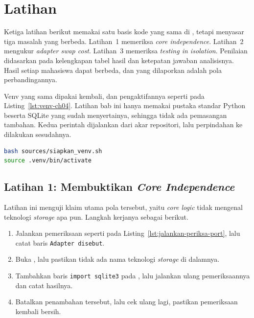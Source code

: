 \section{Latihan}

Ketiga latihan berikut memakai satu basis kode yang sama di
, tetapi menyasar tiga masalah yang berbeda.
Latihan~1 memeriksa \textit{core independence}. Latihan~2 mengukur
\textit{adapter swap cost}. Latihan~3 memeriksa \textit{testing in isolation}.
Penilaian didasarkan pada kelengkapan tabel hasil dan ketepatan jawaban
analisisnya. Hasil setiap mahasiswa dapat berbeda, dan yang dilaporkan adalah
pola perbandingannya.

Venv yang sama dipakai kembali, dan pengaktifannya seperti pada
Listing~\ref{lst:venv-ch04}. Latihan bab ini hanya memakai pustaka standar
Python beserta SQLite yang sudah menyertainya, sehingga tidak ada pemasangan
tambahan. Kedua perintah dijalankan dari akar repositori, lalu perpindahan ke
 dilakukan sesudahnya.

\begin{lstlisting}[language=bash, caption={Mengaktifkan venv sebelum ketiga
  latihan, skrip tersedia di \berkas{sources/siapkan_venv.sh}},
  label=lst:venv-ch04]
bash sources/siapkan_venv.sh
source .venv/bin/activate
\end{lstlisting}

\subsection*{Latihan 1: Membuktikan \textit{Core Independence}}

Latihan ini menguji klaim utama pola tersebut, yaitu \textit{core logic} tidak
mengenal teknologi \textit{storage} apa pun. Langkah kerjanya sebagai berikut.

\begin{enumerate}
  \item Jalankan pemeriksaan seperti pada
    Listing~\ref{lst:jalankan-periksa-port}, lalu catat baris \texttt{Adapter
    disebut}.
  \item Buka , lalu pastikan tidak ada nama
    teknologi \textit{storage} di dalamnya.
  \item Tambahkan baris \texttt{import sqlite3} pada , lalu
    jalankan ulang pemeriksaannya dan catat hasilnya.
  \item Batalkan penambahan tersebut, lalu cek ulang lagi, pastikan pemeriksaan
    kembali bersih.
\end{enumerate}

